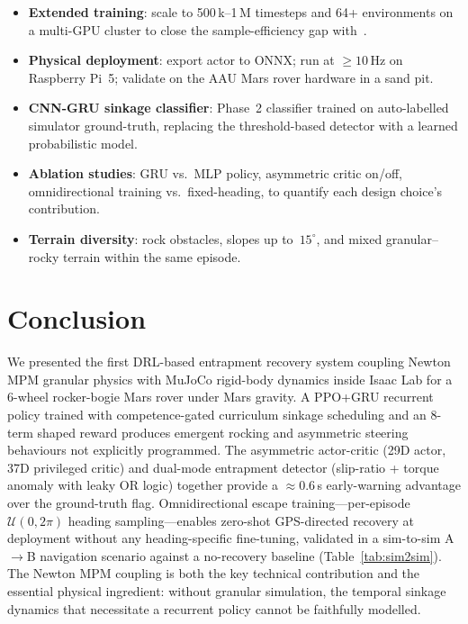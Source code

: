 \documentclass[conference]{IEEEtran}
\begin{document}
\begin{itemize}
  \item \textbf{Extended training}: scale to 500\,k--1\,M timesteps and 64+
        environments on a multi-GPU cluster to close the sample-efficiency gap
        with~\cite{bi2026escape}.
  \item \textbf{Physical deployment}: export actor to ONNX; run at ${\geq}10$\,Hz
        on Raspberry Pi~5; validate on the AAU Mars rover hardware in a sand pit.
  \item \textbf{CNN-GRU sinkage classifier}: Phase~2 classifier trained on
        auto-labelled simulator ground-truth, replacing the threshold-based
        detector with a learned probabilistic model.
  \item \textbf{Ablation studies}: GRU vs.\ MLP policy, asymmetric critic on/off,
        omnidirectional training vs.\ fixed-heading, to quantify each design
        choice's contribution.
  \item \textbf{Terrain diversity}: rock obstacles, slopes up to~$15^\circ$, and
        mixed granular--rocky terrain within the same episode.
\end{itemize}

\FloatBarrier
\section{Conclusion}
\label{sec:conclusion}

We presented the first DRL-based entrapment recovery system coupling Newton MPM
granular physics with MuJoCo rigid-body dynamics inside Isaac Lab for a 6-wheel
rocker-bogie Mars rover under Mars gravity. A PPO+GRU recurrent policy trained
with competence-gated curriculum sinkage scheduling and an 8-term shaped reward
produces emergent rocking and asymmetric steering behaviours not explicitly
programmed. The asymmetric actor-critic (29D actor, 37D privileged critic) and
dual-mode entrapment detector (slip-ratio + torque anomaly with leaky OR logic)
together provide a ${\approx}0.6$\,s early-warning advantage over the ground-truth
flag. Omnidirectional escape training---per-episode $\mathcal{U}(0,2\pi)$ heading
sampling---enables zero-shot GPS-directed recovery at deployment without any
heading-specific fine-tuning, validated in a sim-to-sim A$\to$B navigation
scenario against a no-recovery baseline (Table~\ref{tab:sim2sim}). The Newton MPM
coupling is both the key technical contribution and the essential physical
ingredient: without granular simulation, the temporal sinkage dynamics that
necessitate a recurrent policy cannot be faithfully modelled. \FloatBarrier
\balance


\end{document}
